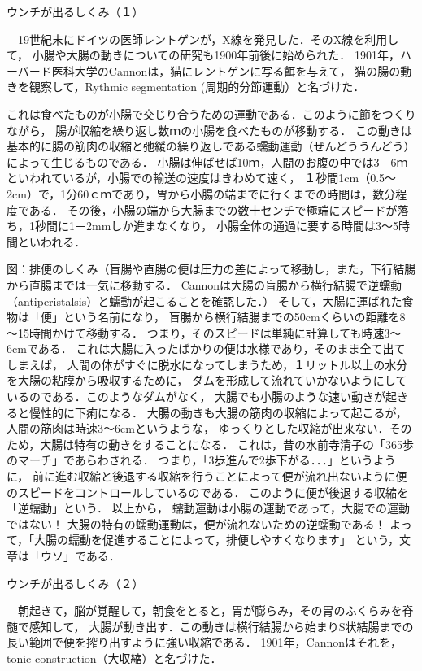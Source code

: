 ウンチが出るしくみ（１）

　19世紀末にドイツの医師レントゲンが，X線を発見した．そのX線を利用して，
小腸や大腸の動きについての研究も1900年前後に始められた．
1901年，ハーバード医科大学のCannonは，猫にレントゲンに写る餌を与えて，
猫の腸の動きを観察して，Rythmic segmentation (周期的分節運動）と名づけた．




これは食べたものが小腸で交じり合うための運動である．このように節をつくりながら，
腸が収縮を繰り返し数ｍの小腸を食べたものが移動する．
この動きは基本的に腸の筋肉の収縮と弛緩の繰り返しである蠕動運動（ぜんどううんどう）によって生じるものである．
小腸は伸ばせば10ｍ，人間のお腹の中では3－6ｍといわれているが，小腸での輸送の速度はきわめて速く，
１秒間1cm（0.5～2cm）で，1分60ｃｍであり，胃から小腸の端までに行くまでの時間は，数分程度である．
その後，小腸の端から大腸までの数十センチで極端にスピードが落ち，1秒間に1－2mmしか進まなくなり，
小腸全体の通過に要する時間は3～5時間といわれる． 

図：排便のしくみ（盲腸や直腸の便は圧力の差によって移動し，また，下行結腸から直腸までは一気に移動する．
Cannonは大腸の盲腸から横行結腸で逆蠕動（antiperistalsis）と蠕動が起こることを確認した．）
そして，大腸に運ばれた食物は「便」という名前になり，
盲腸から横行結腸までの50cmくらいの距離を8～15時間かけて移動する．
つまり，そのスピードは単純に計算しても時速3～6cmである．
これは大腸に入ったばかりの便は水様であり，そのまま全て出てしまえば，
人間の体がすぐに脱水になってしまうため，１リットル以上の水分を大腸の粘膜から吸収するために，
ダムを形成して流れていかないようにしているのである．このようなダムがなく，
大腸でも小腸のような速い動きが起きると慢性的に下痢になる．
大腸の動きも大腸の筋肉の収縮によって起こるが，人間の筋肉は時速3～6cmというような，
ゆっくりとした収縮が出来ない．そのため，大腸は特有の動きをすることになる．
これは，昔の水前寺清子の「365歩のマーチ」であらわされる．
つまり，「3歩進んで2歩下がる．．．」というように，
前に進む収縮と後退する収縮を行うことによって便が流れ出ないように便のスピードをコントロールしているのである．
このように便が後退する収縮を「逆蠕動」という．
以上から，
蠕動運動は小腸の運動であって，大腸での運動ではない！
大腸の特有の蠕動運動は，便が流れないための逆蠕動である！
よって，「大腸の蠕動を促進することによって，排便しやすくなります」
という，文章は「ウソ」である．


ウンチが出るしくみ（２）

　朝起きて，脳が覚醒して，朝食をとると，胃が膨らみ，その胃のふくらみを脊髄で感知して，
大腸が動き出す．この動きは横行結腸から始まりS状結腸までの長い範囲で便を搾り出すように強い収縮である．
1901年，Cannonはそれを，tonic construction（大収縮）と名づけた．



